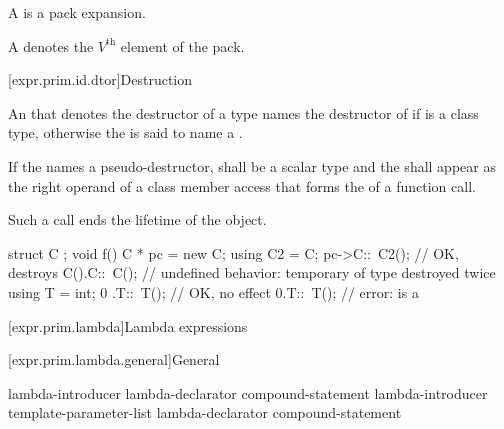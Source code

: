 \pnum
A  is a pack expansion.

\pnum
\begin{note}
A  denotes
the $V^\text{th}$ element of the pack.
\end{note}

[expr.prim.id.dtor]{Destruction}

\pnum
{}%
%
An  that denotes the destructor of a type 
names the destructor of 
if  is a class type,
otherwise the  is said
to name a .

\pnum
If the  names a pseudo-destructor,
 shall be a scalar type and
the  shall appear
as the right operand of a class member access that forms
the  of a function call.
\begin{note}
Such a call ends the lifetime of the object.
\end{note}

\pnum
\begin{example}
\begin{codeblock}
struct C { };
void f() {
  C * pc = new C;
  using C2 = C;
  pc->C::~C2();     // OK, destroys 
  C().C::~C();      // undefined behavior: temporary of type  destroyed twice
  using T = int;
  0 .T::~T();       // OK, no effect
  0.T::~T();        // error:  is a 
}
\end{codeblock}
\end{example}

[expr.prim.lambda]{Lambda expressions}%

[expr.prim.lambda.general]{General}%

\begin{bnf}
\br
    lambda-introducer  lambda-declarator compound-statement\br
    lambda-introducer \terminal{<} template-parameter-list \terminal{>}  \br
    \bnfindent lambda-declarator compound-statement
\end{bnf}

